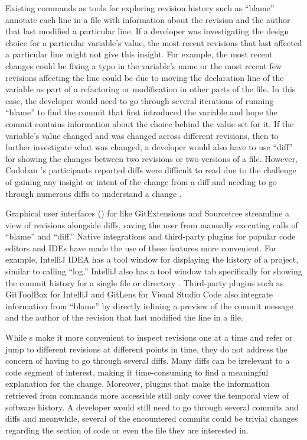 Existing  commands as tools for exploring revision history such as ``blame'' \cite{gitblame} annotate each line in a file with information about the revision and the author that last modified a particular line.
If a developer was investigating the design choice for a particular variable's value, the most recent revisions that last affected a particular line might not give this insight.
For example, the most recent changes could be fixing a typo in the variable's name or the most recent few revisions affecting the line could be due to moving the declaration line of the variable as part of a refactoring or modification in other parts of the file.
In this case, the developer would need to go through several iterations of running ``blame'' to find the commit that first introduced the variable and hope the commit contains information about the choice behind the value set for it.
If the variable's value changed and was changed across different revisions, then to further investigate what was changed, a developer would also have to use  ``diff'' \cite{gitdiff} for showing the changes between two revisions or two versions of a file.
However, Codoban \etal's participants reported diffs were difficult to read due to the challenge of gaining any insight or intent of the change from a diff and needing to go through numerous diffs to understand a change \cite{codoban_software_2015}.

Graphical user interfaces () for  like GitExtensions \cite{gitextensions} and Sourcetree \cite{sourcetree} streamline a view of revisions alongside diffs, saving the user from manually executing calls of  ``blame'' and ``diff.'' 
Native  integrations and third-party plugins for popular code editors and IDEs have made the use of these  features more convenient. 
For example, IntelliJ IDEA \cite{intellij} has a tool window for displaying the  history of a project, similar to calling  ``log.''
IntelliJ also has a tool window tab specifically for showing the commit history for a single file or directory \cite{intellij-showhistory}.
Third-party plugins such as GitToolBox \cite{gittoolbox} for IntelliJ and GitLens \cite{gitlens} for Visual Studio Code also integrate information from  ``blame'' by directly inlining a preview of the commit message and the author of the revision that last modified the line in a file.

While s make it more convenient to inspect revisions one at a time and refer or jump to different revisions at different points in time, they do not address the concern of having to go through several diffs. Many diffs can be irrelevant to a code segment of interest, making it time-consuming to find a meaningful explanation for the change.
Moreover, plugins that make the information retrieved from  commands more accessible still only cover the temporal view of software history.
A developer would still need to go through several commits and diffs and meanwhile, several of the encountered commits could be trivial changes regarding the section of code or even the file they are interested in.

